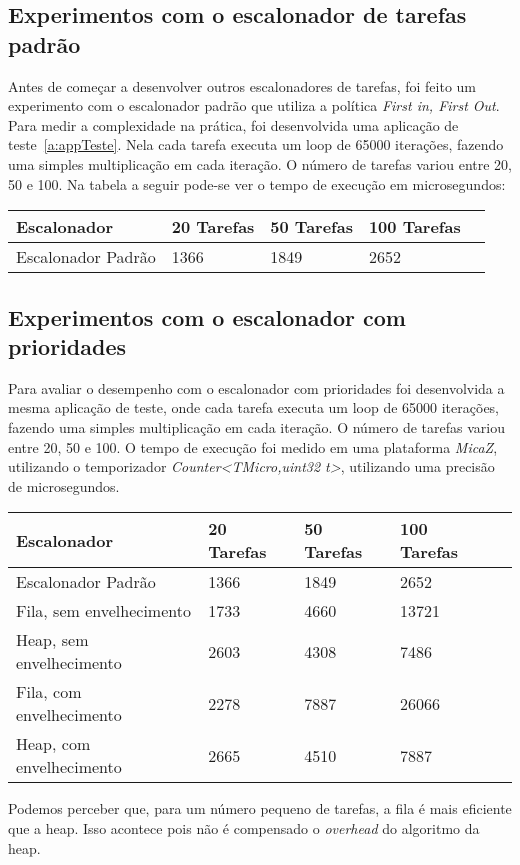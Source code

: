 \subsection{Experimentos com o escalonador de tarefas padrão}
Antes de começar a desenvolver outros escalonadores de tarefas, foi feito um experimento com o escalonador 
padrão que utiliza a política \textit{First in, First Out}.
Para medir a complexidade na prática, foi desenvolvida uma aplicação de teste~\ref{a:appTeste}. Nela cada tarefa executa um loop de 65000
iterações, fazendo uma simples multiplicação em cada iteração. O número de tarefas variou entre 20, 50 e 100.
Na tabela a seguir pode-se ver o tempo de execução em microsegundos:
\begin{center}
    \begin{tabular}{ | l | l | l | l | p{5cm} |}
    \hline
    Escalonador              & 20 Tarefas & 50 Tarefas & 100 Tarefas \\ \hline
    Escalonador Padrão       & 1366 & 1849 & 2652 \\ \hline
    \end{tabular}
\end{center}

\subsection{Experimentos com o escalonador com prioridades}
Para avaliar o desempenho com o escalonador com prioridades foi desenvolvida a mesma aplicação de teste,
onde cada tarefa executa um loop de 65000 iterações, fazendo uma simples multiplicação em cada iteração. 
O número de tarefas variou entre 20, 50 e 100.
O tempo de execução foi medido em uma plataforma \textit{MicaZ}, utilizando o temporizador 
\textit{Counter<TMicro,uint32 t>}, utilizando uma precisão de microsegundos.
\begin{center}
    \begin{tabular}{ | l | l | l | l | p{5cm} |}
    \hline
    Escalonador              & 20 Tarefas & 50 Tarefas & 100 Tarefas \\ \hline
    Escalonador Padrão       & 1366 & 1849 & 2652 \\ \hline 
    Fila, sem envelhecimento & 1733 & 4660 & 13721 \\ \hline 
    Heap, sem envelhecimento & 2603 & 4308 & 7486 \\ \hline
    Fila, com envelhecimento & 2278 & 7887 & 26066 \\ \hline
    Heap, com envelhecimento & 2665 & 4510 & 7887 \\ \hline
    \end{tabular}
\end{center}

Podemos perceber que, para um número pequeno de tarefas, a fila é mais eficiente que a heap. Isso acontece pois
não é compensado o \textit{overhead} do algoritmo da heap.

